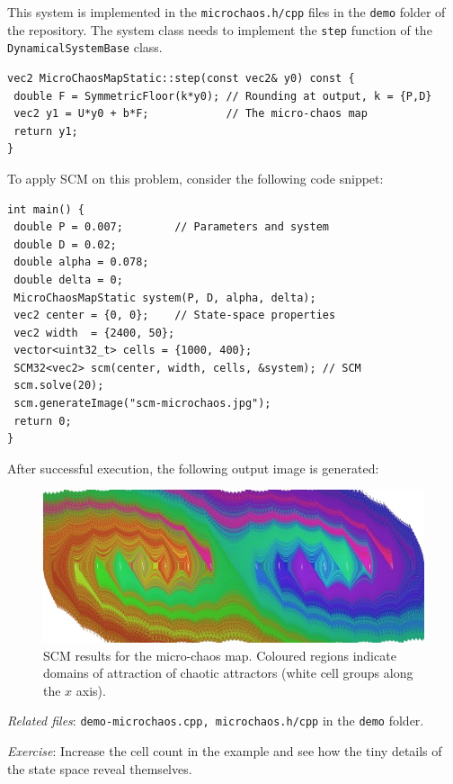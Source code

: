 \documentclass[11pt]{article}
\begin{document}
This system is implemented in the \texttt{microchaos.h/cpp} files in the \texttt{demo} folder of the repository. The system class needs to implement the \texttt{step} function of the \texttt{DynamicalSystemBase} class.

\begin{lstlisting}
vec2 MicroChaosMapStatic::step(const vec2& y0) const {
 double F = SymmetricFloor(k*y0); // Rounding at output, k = {P,D}
 vec2 y1 = U*y0 + b*F;            // The micro-chaos map
 return y1;
}
\end{lstlisting}

To apply SCM on this problem, consider the following code snippet:

\begin{lstlisting}
int main() {
 double P = 0.007;        // Parameters and system
 double D = 0.02;
 double alpha = 0.078;
 double delta = 0;
 MicroChaosMapStatic system(P, D, alpha, delta);
 vec2 center = {0, 0};    // State-space properties
 vec2 width  = {2400, 50};
 vector<uint32_t> cells = {1000, 400};
 SCM32<vec2> scm(center, width, cells, &system); // SCM
 scm.solve(20);
 scm.generateImage("scm-microchaos.jpg");
 return 0;
}
\end{lstlisting}
\newpage 
After successful execution, the following output image is generated:

\begin{figure}[h!]
	\centering
	\includegraphics[width=15cm]{fig/microchaos.jpg}
	\caption{SCM results for the micro-chaos map. Coloured regions indicate domains of attraction of chaotic attractors (white cell groups along the $x$ axis).}
\end{figure}

\noindent \emph{Related files}: \texttt{demo-microchaos.cpp, microchaos.h/cpp} in the \texttt{demo} folder.

\noindent \emph{Exercise}: Increase the cell count in the example and see how the tiny details of the state space reveal themselves.
\end{document}

